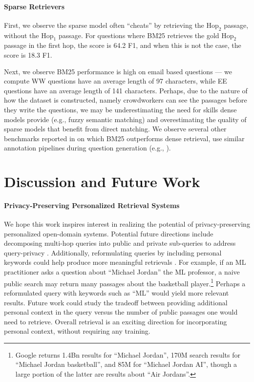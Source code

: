 \documentclass{article}
\renewcommand\cite{\citep}	\newcommand\shortcite{\citeyearpar}\newcommand\newcite{\citet}
\begin{document}
\paragraph{Sparse Retrievers} First, we observe the sparse model often ``cheats'' by retrieving the $\mathrm{Hop_2}$ passage, without the $\mathrm{Hop_1}$ passage. For questions where BM25 retrieves the gold $\mathrm{Hop_2}$ passage in the first hop, the score is 64.2 F1, and when this is not the case, the score is 18.3 F1. 

Next, we observe BM25 performance is high on email based questions --- we compute WW questions have an average length of 97 characters, while EE questions have an average length of 141 characters. Perhaps, due to the nature of how the dataset is constructed, namely crowdworkers can see the passages before they write the questions, we may be underestimating the need for skills dense models provide (e.g., fuzzy semantic matching)  and overestimating the quality of sparse models that benefit from direct matching. We observe several other benchmarks reported in \cite{thakur2021beir} on which BM25 outperforms dense retrieval, use similar annotation pipelines during question generation (e.g., \citet{wadden2020factorfiction, yang2018hotpotqa}). 



 





\section{Discussion and Future Work}
\paragraph{Privacy-Preserving Personalized Retrieval Systems} We hope this work inspires interest in realizing the potential of privacy-preserving personalized open-domain systems. Potential future directions include decomposing multi-hop queries into public and private sub-queries to address query-privacy \cite{min2019multihopdecomp, perez2020qadecomp}. Additionally, reformulating queries by including personal keywords could help produce more meaningful retrievals \cite{carpineto2012aqe}. For example, if an ML practitioner asks a question about ``Michael Jordan'' the ML professor, a naive public search may return many passages about the basketball player.\footnote{Google returns 1.4Bn results for ``Michael Jordan'', 170M search results for ``Michael Jordan basketball'', and 85M for ``Michael Jordan AI'', though a large portion of the latter are results about ``Air Jordans''.} Perhaps a reformulated query with keywords such as ``ML'' would yield more relevant results. Future work could study the tradeoff between providing additional personal context in the query versus the number of public passages one would need to retrieve. Overall retrieval is an exciting direction for incorporating personal context, without requiring any training.
\end{document}
